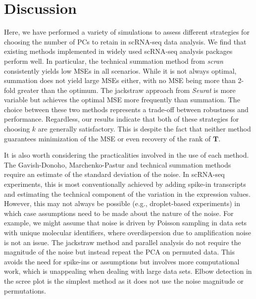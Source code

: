 \documentclass[10pt,letterpaper]{article}
\begin{document}
\section{Discussion}
Here, we have performed a variety of simulations to assess different strategies for choosing the number of PCs to retain in scRNA-seq data analysis.
We find that existing methods implemented in widely used scRNA-seq analysis packages perform well.
In particular, the technical summation method from \textit{scran} consistently yields low MSEs in all scenarios.
While it is not always optimal, summation does not yield large MSEs either, with no MSE being more than 2-fold greater than the optimum.
The jackstraw approach from \textit{Seurat} is more variable but achieves the optimal MSE more frequently than summation.
The choice between these two methods represents a trade-off between robustness and performance.
Regardless, our results indicate that both of these strategies for choosing $k$ are generally satisfactory.
This is despite the fact that neither method guarantees minimization of the MSE or even recovery of the rank of $\mathbf{T}$.

It is also worth considering the practicalities involved in the use of each method.
The Gavish-Donoho, Marchenko-Pastur and technical summation methods require an estimate of the standard deviation of the noise.
In scRNA-seq experiments, this is most conventionally achieved by adding spike-in transcripts and estimating the technical component of the variation in the expression values.
However, this may not always be possible (e.g., droplet-based experiments) in which case assumptions need to be made about the nature of the noise.
For example, we might assume that noise is driven by Poisson sampling in data sets with unique molecular identifiers, where overdispersion due to amplification noise is not an issue.
The jackstraw method and parallel analysis do not require the magnitude of the noise but instead repeat the PCA on permuted data.
This avoids the need for spike-ins or assumptions but involves more computational work, which is unappealing when dealing with large data sets.
Elbow detection in the scree plot is the simplest method as it does not use the noise magnitude or permutations.
\end{document}
